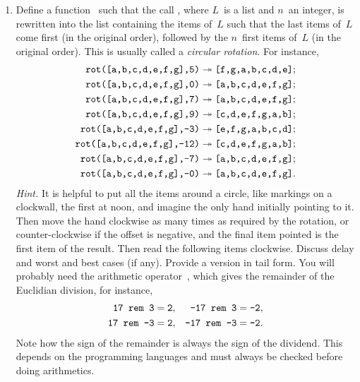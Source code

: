 \begin{enumerate}
  \item Define a function~ such that the call
    , where \(L\)~is a list and \(n\)~an
    integer, is rewritten into the list containing the items of~\(L\)
    such that the  last items of~\(L\)
    come first (in the original order), followed by the \(n\)~first
    items of~\(L\) (in the original order). This is usually called a
    \emph{circular rotation}. For instance,
    \begin{align*}
      \texttt{rot([a,b,c,d,e,f,g],5)}
      &\twoheadrightarrow
      \texttt{[f,g,a,b,c,d,e]};\\
      \texttt{rot([a,b,c,d,e,f,g],0)}
      &\twoheadrightarrow
      \texttt{[a,b,c,d,e,f,g]};\\
      \texttt{rot([a,b,c,d,e,f,g],7)}
      &\twoheadrightarrow
      \texttt{[a,b,c,d,e,f,g]};\\
      \texttt{rot([a,b,c,d,e,f,g],9)}
      &\twoheadrightarrow
      \texttt{[c,d,e,f,g,a,b]};\\
      \texttt{rot([a,b,c,d,e,f,g],-3)}
      &\twoheadrightarrow
      \texttt{[e,f,g,a,b,c,d]};\\
      \texttt{rot([a,b,c,d,e,f,g],-12)}
      &\twoheadrightarrow
      \texttt{[c,d,e,f,g,a,b]};\\
      \texttt{rot([a,b,c,d,e,f,g],-7)}
      &\twoheadrightarrow
      \texttt{[a,b,c,d,e,f,g]};\\
      \texttt{rot([a,b,c,d,e,f,g],-0)}
      &\twoheadrightarrow
      \texttt{[a,b,c,d,e,f,g]}.
    \end{align*}
    \emph{Hint.} It is helpful to put all the items around a circle,
    like markings on a clockwall, the first at noon, and imagine the
    only hand initially pointing to it. Then move the hand clockwise
    as many times as required by the rotation, or
    counter\hyp{}clockwise if the offset is negative, and the final
    item pointed is the first item of the result. Then read the
    following items clockwise. Discuss delay and worst and best cases
    (if any). Provide a version in tail form. You will probably need
    the arithmetic operator~, which gives the remainder
    of the Euclidian division, for instance,
    \begin{align*}
       \texttt{17 rem 3}   &= \texttt{2},
     & \texttt{-17 rem 3}  &= \texttt{-2},\\
      \texttt{17 rem -3}  &= \texttt{2},
     & \texttt{-17 rem -3} &= \texttt{-2}.
    \end{align*}
    Note how the sign of the remainder is always the sign of the
    dividend. This depends on the programming languages and must
    always be checked before doing arithmetics.


\end{enumerate}
